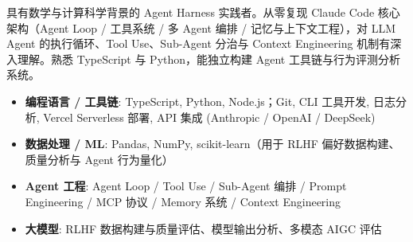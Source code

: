 \documentclass[zh]{resume}
\begin{document}
\begin{tcolorbox}[colback=accentcolor!12, colframe=accentcolor!20,
  arc=0pt, boxrule=0.3pt, left=6pt, right=6pt, top=3pt, bottom=3pt,
  sharp corners]
\makeheader
\end{tcolorbox}

\vspace{0.15em}

具有数学与计算科学背景的 Agent Harness 实践者。从零复现 Claude Code 核心架构（Agent Loop / 工具系统 / 多 Agent 编排 / 记忆与上下文工程），对 LLM Agent 的执行循环、Tool Use、Sub-Agent 分治与 Context Engineering 机制有深入理解。熟悉 TypeScript 与 Python，能独立构建 Agent 工具链与行为评测分析系统。

\begin{itemize}
    \item \textbf{编程语言 / 工具链}: TypeScript, Python, Node.js；Git, CLI 工具开发, 日志分析, Vercel Serverless 部署, API 集成 (Anthropic / OpenAI / DeepSeek)
    \item \textbf{数据处理 / ML}: Pandas, NumPy, scikit-learn（用于 RLHF 偏好数据构建、质量分析与 Agent 行为量化）
    \item \textbf{Agent 工程}: Agent Loop / Tool Use / Sub-Agent 编排 / Prompt Engineering / MCP 协议 / Memory 系统 / Context Engineering
    \item \textbf{大模型}: RLHF 数据构建与质量评估、模型输出分析、多模态 AIGC 评估
\end{itemize}
\end{document}
